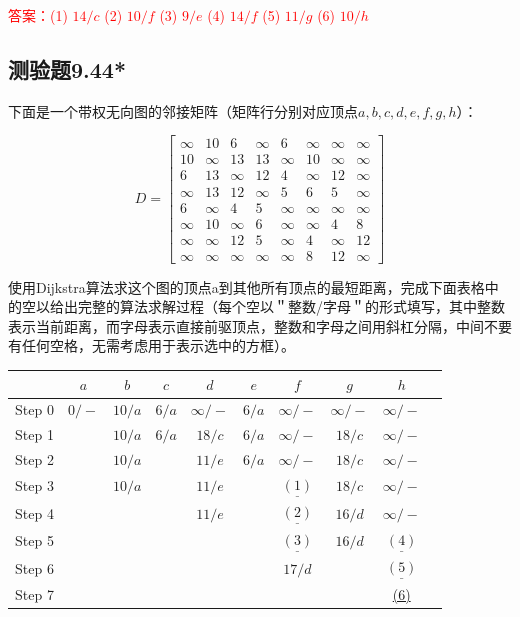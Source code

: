 \documentclass[UTF8, heading=true]{ctexart}
\begin{document}
\textcolor{red}{答案：(1) $14 / c$
(2) $10 / {f}$
(3) $9/e$
(4) $14 / {f}$
(5) $11 / {g}$
(6) $10 / {h}$}

\subsection{测验题9.44*}

下面是一个带权无向图的邻接矩阵（矩阵行分别对应顶点$a,b,c,d,e,f,g,h$）：

\begin{table}[H]
  \renewcommand{\arraystretch}{1.5}
  \centering
$$
D=\left[\begin{array}{cccccccc}
\infty & 10 & 6 & \infty & 6 & \infty & \infty & \infty \\
10 & \infty & 13 & 13 & \infty & 10 & \infty & \infty \\
6 & 13 & \infty & 12 & 4 & \infty & 12 & \infty \\
\infty & 13 & 12 & \infty & 5 & 6 & 5 & \infty \\
6 & \infty & 4 & 5 & \infty & \infty & \infty & \infty \\
\infty & 10 & \infty & 6 & \infty & \infty & 4 & 8 \\
\infty & \infty & 12 & 5 & \infty & 4 & \infty & 12 \\
\infty & \infty & \infty & \infty & \infty & 8 & 12 & \infty
\end{array}\right]
$$
\end{table}

使用Dijkstra算法求这个图的顶点a到其他所有顶点的最短距离，完成下面表格中的空以给出完整的算法求解过程（每个空以＂整数/字母＂的形式填写，其中整数表示当前距离，而字母表示直接前驱顶点，整数和字母之间用斜杠分隔，中间不要有任何空格，无需考虑用于表示选中的方框）。

\begin{table}[H]
  \renewcommand{\arraystretch}{1.5}
  \centering
  \begin{tabular}{c|c|c|c|c|c|c|c|c|c}
    \hline
    & $a$ & $b$ & $c$ & $d$ & $e$ & $f$ & $g$ & $h$ \\
    \hline
    Step 0 & $\boxed{0}/-$ & $10 / a$ & $6 / a$ & $\infty /-$ & $6 / a$ & $\infty /-$ & $\infty /-$ & $\infty /-$ \\
    \hline
    Step 1 &  & $10 / a$ & $\boxed{6} / a$ & $18 / c$ & $6/a$ & $\infty /-$ & $18/c$ & $\infty /-$ \\
    \hline
    Step 2 &  & $10 / a$ &  & $11 / e$ & $\boxed{6} /a$ & $\infty /-$ & $18/c$ & $\infty/-$ \\
    \hline
    Step 3 & & $\boxed{10} / a$ &  & $11/e$ &  & $\underline{(1)}$ & $18 /c$ & $\infty /-$ \\
    \hline
    Step 4 & &  & & $\boxed{11} / e$ &  & $\underline{(2)}$ & $16 /d$ & $\infty /-$ \\
    \hline
    Step 5 & &  & &  &  & $\underline{(3)}$ & $\boxed{16} / d$ & $\underline{(4)}$ \\
    \hline
    Step 6 & & & & & & $\boxed{17} / d$ &  & $\underline{(5)}$ \\
    \hline
    Step 7 & &  & & & & & & \underline{(6)} \\
    \hline
  \end{tabular}
\end{table}
\end{document}
